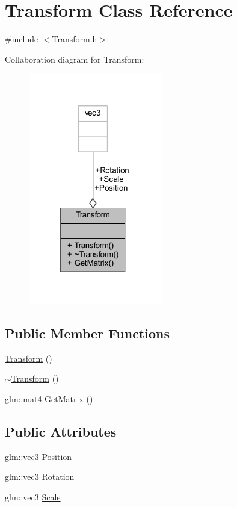 \hypertarget{classTransform}{}\section{Transform Class Reference}
\label{classTransform}


{\ttfamily \#include $<$Transform.\+h$>$}



Collaboration diagram for Transform\+:
\nopagebreak
\begin{figure}[H]
\begin{center}
\leavevmode
\includegraphics[width=166pt]{classTransform__coll__graph}
\end{center}
\end{figure}
\subsection*{Public Member Functions}
\begin{DoxyCompactItemize}
\item 
\mbox{\hyperlink{classTransform_aa08ca4266efabc768973cdeea51945ab}{Transform}} ()
\item 
\mbox{\hyperlink{classTransform_aa72e286c069850db80927b0e6554cd3e}{$\sim$\+Transform}} ()
\item 
glm\+::mat4 \mbox{\hyperlink{classTransform_ac71c79e10f11990100cd219f25879dd0}{Get\+Matrix}} ()
\end{DoxyCompactItemize}
\subsection*{Public Attributes}
\begin{DoxyCompactItemize}
\item 
glm\+::vec3 \mbox{\hyperlink{classTransform_a1ee81ac62c423e027d979454a373b991}{Position}}
\item 
glm\+::vec3 \mbox{\hyperlink{classTransform_a0b39a3cad853ab427a91b761d82440d2}{Rotation}}
\item 
glm\+::vec3 \mbox{\hyperlink{classTransform_a337690a3de8862de2f930e9ee1323365}{Scale}}
\end{DoxyCompactItemize}


